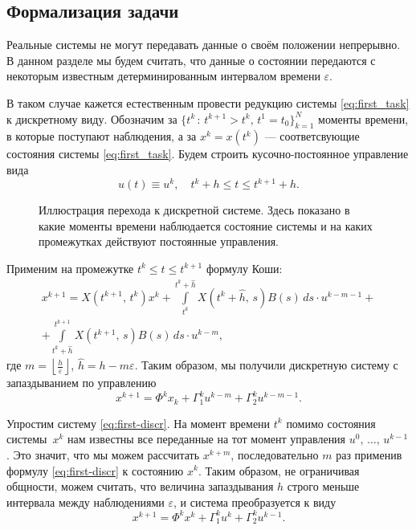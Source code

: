 \subsection{Формализация задачи}

Реальные системы не могут передавать данные о своём положении непрерывно.
В данном разделе мы будем считать, что данные о состоянии передаются с некоторым известным детерминированным интервалом времени $\varepsilon$.

В таком случае кажется естественным провести редукцию системы \eqref{eq:first_task} к дискретному виду.
Обозначим за $\{t^k\,:\,t^{k+1} > t^k,\,t^1=t_0\}_{k=1}^N$ моменты времени, в которые поступают наблюдения, а за $x^k = x(t^k)$ --- соответсвующие состояния системы \eqref{eq:first_task}.
Будем строить кусочно-постоянное управление вида
$$
        u(t) \equiv u^{k},
        \quad
        t^{k} + h \leqslant t \leqslant t^{k+1} + h.
$$

\begin{figure}[h]
        \centering
        
        \caption{Иллюстрация перехода к дискретной системе. Здесь показано в какие моменты времени наблюдается состояние системы и на каких промежутках действуют постоянные управления.}
\end{figure}

Применим на промежутке $t^k \leqslant t \leqslant t^{k+1}$ формулу Коши:
\begin{multline*}
x^{k+1} = X(t^{k+1},\,t^k)x^k
+
\int\limits_{t^k}^{t^{k} + \hat h} X(t^{k} + \hat h,\,s)B(s)\,ds\cdot u^{k-m-1}
+\\+
\int\limits_{t^{k} +\hat h}^{t^{k+1}} X(t^{k+1},\,s)B(s)\,ds\cdot u^{k-m},
\end{multline*}
где $m = \left\lfloor\frac{h}{\varepsilon}\right\rfloor$, $\hat h = h - m\varepsilon$.
Таким образом, мы получили дискретную систему с запаздыванием по управлению
\begin{equation}\label{eq:first-discr}
        x^{k+1} = \Phi^k x_k + \Gamma_1^k u^{k-m} + \Gamma_2^k u^{k-m-1}.
\end{equation}

Упростим систему \eqref{eq:first-discr}. На момент времени $t^k$ помимо состояния системы~$x^{k}$ нам известны все переданные на тот момент управления $u^0,\,\ldots,\,u^{k-1}$. Это значит, что мы можем рассчитать $x^{k+m}$, последовательно $m$ раз применив формулу \eqref{eq:first-discr} к состоянию $x^k$. Таким образом, не ограничивая общности, можем считать, что величина запаздывания $h$ строго меньше интервала между наблюдениями $\varepsilon$, и система преобразуется к виду
\begin{equation}\label{eq:main-discr}
        x^{k+1} = \Phi^kx^k + \Gamma_1^ku^k + \Gamma_2^ku^{k-1}.
\end{equation}

